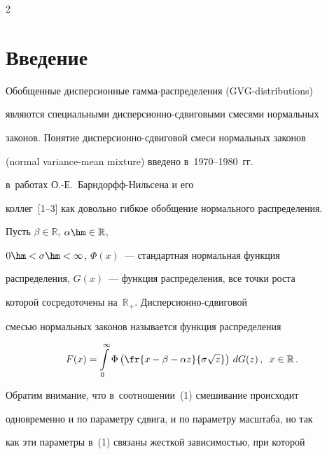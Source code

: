 \begin{multicols}{2}





\label{st\stat}





\section{Введение}





Обобщенные дисперсионные гам\-ма-рас\-пре\-де\-ле\-ния (GVG-distributions)


являются специальными дисперсионно-сдвиговыми смесями нормальных


законов. Понятие дис\-пер\-си\-он\-но-сдви\-го\-вой смеси нормальных законов


(normal variance-mean mixture) введено в~1970--1980~гг.\ 


в~работах \mbox{О.-Е.}~Барн\-дорфф-Ниль\-се\-на и его


коллег~[1--3] как довольно гибкое обобщение нормального распределения.





Пусть $\beta\in\mathbb{R}$, $\alpha\hm\in\mathbb{R}$,


$0\hm<\sigma\hm<\infty$, $\Phi(x)$~--- стандартная нормальная функция


распределения, $G(x)$~--- функция распределения, все точки роста


которой сосредоточены на~$\mathbb{R}_+$. Дис\-пер\-си\-он\-но-сдви\-го\-вой


смесью нормальных законов называется функция распределения


\begin{equation}


F(x)=\int\limits_{0}^{\infty}\Phi\left(\fr{x-\beta-\alpha


z}{\sigma\sqrt{z}}\right)\,dG(z)\,,\enskip x\in \mathbb{R}\,.


\label{e1-kk}


\end{equation}


Обратим внимание, что в~соотношении~(1) смешивание происходит


одновременно и по параметру сдвига, и по параметру масштаба, но так


как эти параметры в~(1) связаны жесткой зависимостью, при которой



\end{multicols}
